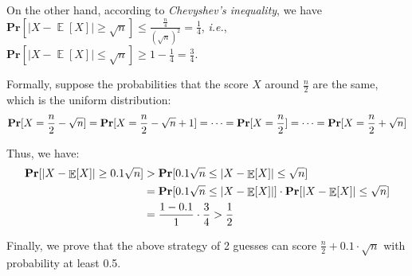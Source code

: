 \documentclass[12pt]{article}
\DeclareMathOperator*{\E}{\mathbb{E}}
\def\ie{\textit{i.e.}\xspace}
\begin{document}
\begin{problem}
\begin{enumerate}[(a)]
On the other hand, according to \textit{Chevyshev's inequality}, we have $\mathbf{Pr}[|X - \E[X]| \ge \sqrt{n}] \le \frac{\frac{n}{4}}{(\sqrt{n})^2} = \frac{1}{4}$, 
\ie, $\mathbf{Pr}[|X - \E[X]| \le \sqrt{n}] \ge 1 - \frac{1}{4} = \frac{3}{4}$.

Formally, suppose the probabilities that the score $X$ around $\frac{n}{2}$ are the same, which is the uniform distribution:
\begin{equation}
\begin{aligned}
\mathbf{Pr}[X = \frac{n}{2} - \sqrt{n}] = \mathbf{Pr}[X = \frac{n}{2} - \sqrt{n} + 1] = \cdots = \mathbf{Pr}[X = \frac{n}{2}] = \cdots = \mathbf{Pr}[X = \frac{n}{2} + \sqrt{n}] \notag
\end{aligned}
\end{equation}

Thus, we have:
\begin{equation}
\begin{aligned}
\mathbf{Pr}[|X - \E[X]| \ge 0.1\sqrt{n}] &> \mathbf{Pr}[0.1\sqrt{n} \le |X - \E[X]| \le \sqrt{n}] \\ \notag
&= \mathbf{Pr}[0.1\sqrt{n} \le |X - \E[X]|] \cdot \mathbf{Pr}[|X - \E[X]| \le \sqrt{n}] \\
&= \frac{1-0.1}{1} \cdot \frac{3}{4} > \frac{1}{2}
\end{aligned}
\end{equation}

Finally, we prove that the above strategy of 2 guesses can score $\frac{n}{2} + 0.1 \cdot \sqrt{n}$ with probability at least 0.5.
\end{enumerate}
\end{problem}
\end{document}
